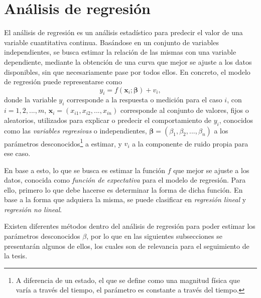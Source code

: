 \section{Análisis de regresión}
El análisis de regresión es un análisis estadístico para predecir el valor de una variable cuantitativa continua. Basándose en un conjunto de variables independientes, se busca estimar la relación de las mismas con una variable dependiente, mediante la obtención de una curva que mejor se ajuste a los datos disponibles, sin que necesariamente pase por todos ellos. En concreto, el modelo de regresión puede representarse como
\begin{equation}
    y_i = f(\bm{x}_i; \bm{\beta}) + v_i,
    \label{eq:regressionmodel}
\end{equation}
donde la variable $y_i$ corresponde a la respuesta o medición para el caso $i$, con $i = 1, 2, ..., m$, $\bm{x}_i = (x_{i1}, x_{i2}, ..., x_{in})$ corresponde al conjunto de valores, fijos o aleatorios, utilizados para explicar o predecir el comportamiento de $y_i$, conocidos como las \textit{variables regresivas} o independientes, $\bm{\beta} = (\beta_1, \beta_2, ..., \beta_n)$ a los parámetros desconocidos\footnote{A diferencia de un estado, el que se define como una magnitud física que varía a través del tiempo, el parámetro es constante a través del tiempo.} a estimar, y $v_i$ a la componente de ruido propia para ese caso.

En base a esto, lo que se busca es estimar la función $f$ que mejor se ajuste a los datos, conocida como \textit{función de expectativa} para el modelo de regresión. Para ello, primero lo que debe hacerse es determinar la forma de dicha función. En base a la forma que adquiera la misma, se puede clasificar en \textit{regresión lineal} y \textit{regresión no lineal}.

Existen diferentes métodos dentro del análisis de regresión para poder estimar los parámetros desconocidos $\beta$, por lo que en las siguientes subsecciones se presentarán algunos de ellos, los cuales son de relevancia para el seguimiento de la tesis.



